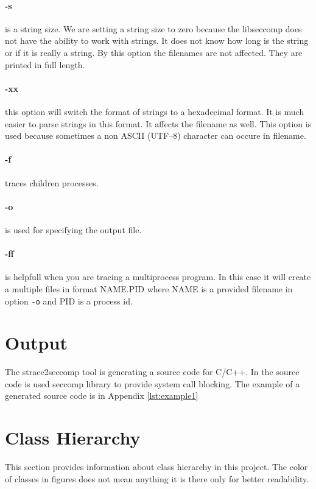 \paragraph{-s} is a string size. We are setting a string size to zero because
the libseccomp does not have the ability to work with strings. It does not know
how long is the string or if it is really a string. By this option the filenames
are not affected. They are printed in full length.

\paragraph{-xx} this option will switch the format of strings to a hexadecimal format.
It is much easier to parse strings in this format. It affects the filename as well.
This option is used because sometimes a non ASCII (UTF--8) character can occure in filename.

\paragraph{-f} traces children processes.

\paragraph{-o} is used for specifying the output file.

\paragraph{-ff} is helpfull when you are tracing a multiprocess program. In this
case it will create a multiple files in format NAME.PID where NAME is a provided
filename in option \texttt{-o} and PID is a process id.

\section{Output}
The strace2seccomp tool is generating a source code for C/C++.
In the source code is used seccomp library to provide system call blocking.
The example of a generated source code is in Appendix \ref{lst:example1}

\section{Class Hierarchy}
This section provides information about class hierarchy in this project. The
color of classes in figures does not mean anything it is there only for better
readability.

